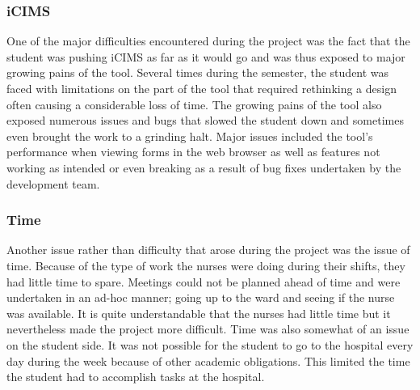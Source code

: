 \subsubsection{iCIMS}
One of the major difficulties encountered during the project was the fact that the student was pushing iCIMS as far as it would go and was thus exposed to major growing pains of the tool. Several times during the semester, the student was faced with limitations on the part of the tool that required rethinking a design often causing a considerable loss of time. The growing pains of the tool also exposed numerous issues and bugs that slowed the student down and sometimes even brought the work to a grinding halt. Major issues included the tool's performance when viewing forms in the web browser as well as features not working as intended or even breaking as a result of bug fixes undertaken by the development team.  

\subsubsection{Time}
Another issue rather than difficulty that arose during the project was the issue of time. Because of the type of work the nurses were doing during their shifts, they had little time to spare. Meetings could not be planned ahead of time and were undertaken in an ad-hoc manner; going up to the ward and seeing if the nurse was available. It is quite understandable that the nurses had little time but it nevertheless made the project more difficult. Time was also somewhat of an issue on the student side. It was not possible for the student to go to the hospital every day during the week because of other academic obligations. This limited the time the student had to accomplish tasks at the hospital.

